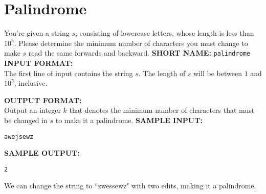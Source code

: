 \documentclass[twoside]{article}
\newcommand{\blank}{\vskip 3mm}
\begin{document}



\section{Palindrome}

You're given a string $s$, consisting of lowercase letters, whose length is less than $10^5$.
Please determine the minimum number of characters you must change to make $s$ read the same forwards and backward.
\blank
\textbf{SHORT NAME:} \verb|palindrome|
\blank
\textbf{INPUT FORMAT:}\\
The first line of input contains the string $s$. The length of $s$ will be between $1$ and $10^5$, inclusive.

\blank
\textbf{OUTPUT FORMAT:}\\
Output an integer $k$ that denotes the minimum number of characters that must be changed in $s$ to make it a palindrome.
\blank
\textbf{SAMPLE INPUT:}
\begin{verbatim}
awejsewz
\end{verbatim}
\textbf{SAMPLE OUTPUT:}
\begin{verbatim}
2
\end{verbatim}

We can change the string to ``zwessewz" with two edits, making it a palindrome.
\end{document}
